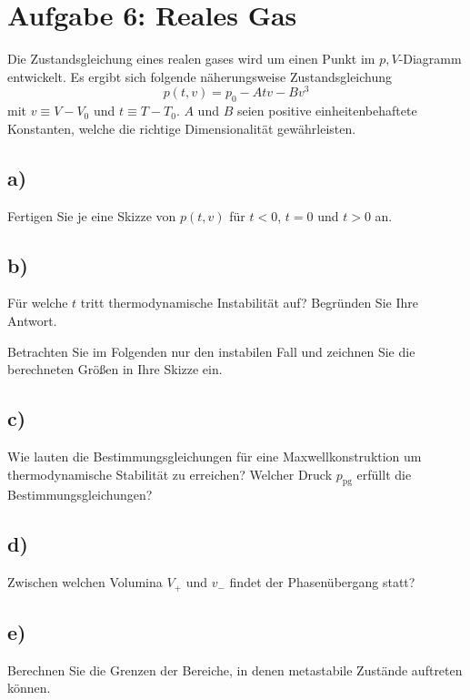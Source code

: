 \section{Aufgabe 6: Reales Gas}
Die Zustandsgleichung eines realen gases wird um einen Punkt im $p,V$-Diagramm entwickelt.
Es ergibt sich folgende näherungsweise Zustandsgleichung
\[
    p(t,v) = p_0 - Atv - Bv^3
\]
mit $v \equiv V - V_0$ und $t \equiv T - T_0$. $A$ und $B$ seien positive einheitenbehaftete Konstanten, welche die richtige Dimensionalität gewährleisten.

\subsection{a)}
Fertigen Sie je eine Skizze von $p(t,v)$ für $t<0$, $t=0$ und $t>0$ an.

\subsection{b)}
Für welche $t$ tritt thermodynamische Instabilität auf?
Begründen Sie Ihre Antwort.


Betrachten Sie im Folgenden nur den instabilen Fall und zeichnen Sie die berechneten Größen in Ihre Skizze ein.

\subsection{c)}
Wie lauten die Bestimmungsgleichungen für eine Maxwellkonstruktion um thermodynamische Stabilität zu erreichen?
Welcher Druck $p_\text{pg}$ erfüllt die Bestimmungsgleichungen?

\subsection{d)}
Zwischen welchen Volumina $V_+$ und $v_-$ findet der Phasenübergang statt?

\subsection{e)}
Berechnen Sie die Grenzen der Bereiche, in denen metastabile Zustände auftreten können.


